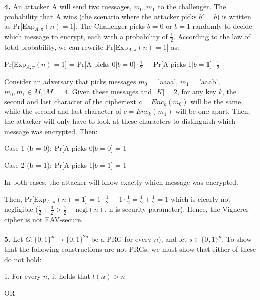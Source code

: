 \documentclass[12pt]{article}
\begin{document}
\\
\\
\noindent \textbf{4.} An attacker A will send two messages, $m_0, m_1$ to the challenger. The probability that A wins (the scenario where the attacker picks $b' = b$) is written as Pr[Exp$_{A,\pi}(n)=1$]. The Challenger picks $b = 0$ or $b = 1$ randomly to decide which message to encrypt, each with a probability of $\frac{1}{2}$. According to the law of total probability, we can rewrite Pr[Exp$_{A,\pi}(n)=1$] as:
\begin{center}
Pr[Exp$_{A,\pi}(n)=1$] = Pr[A picks 0$|b=0] \cdot \frac{1}{2}$ + Pr[A picks 1$|b=1] \cdot \frac{1}{2}$
\end{center}
Consider an adversary that picks messages $m_0$ = 'aaaa', $m_1$ = 'aaab', $m_0, m_1 \in M, |M| = 4$. Given these messages and $|K| = 2$, for any key $k$, the second and last character of the ciphertext $c = Enc_{k}(m_0)$ will be the same, while the second and last character of $c = Enc_{k}(m_1)$ will be one apart. Then, the attacker will only have to look at these characters to distinguish which message was encrypted. Then:

Case 1 (b = 0): Pr[A picks 0$|b=0]$ = 1

Case 2 (b = 1): Pr[A picks 1$|b=1]$ = 1

In both cases, the attacker will know exactly which message was encrypted.

\noindent Then, Pr[Exp$_{A,\pi}(n)=1$] = $1 \cdot \frac{1}{2}$ + $1 \cdot \frac{1}{2} = \frac{1}{2} + \frac{1}{2} = 1$ which is clearly not negligible ($\frac{1}{2} + \frac{1}{2} > \frac{1}{2} + \text{negl}(n)$, n is security parameter). Hence, the Vignerer cipher is not EAV-secure.
\\
\\
\noindent \textbf{5.} Let $G: \{0,1\}^n \rightarrow \{0,1\}^{2n}$ be a PRG for every $n$), and let $s \in \{0,1\}^n$. To show that the following constructions are not PRGs, we must show that either of these do not hold:

1. For every $n$, it holds that $l(n)>n$

OR
\end{document}
